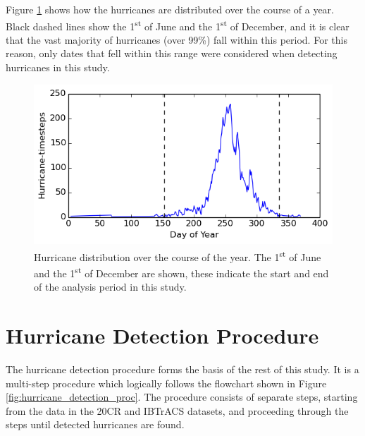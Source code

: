\documentclass[pdftex,12pt,a4paper]{report}
\newcommand{\ts}{\textsuperscript}
\begin{document}
\newpage
Figure \ref{fig:yearly_hurr_dist} shows how the hurricanes are distributed over the course of a
year. Black dashed lines show the 1\ts{st} of June and the 1\ts{st} of December, and it is clear
that the vast majority of hurricanes (over 99\%) fall within this period. For this reason, only
dates that fell within this range were considered when detecting hurricanes in this study.

\begin{figure}[hb!]
    \centering
    \includegraphics[width=\textwidth]{figures/yearly_hurr_dist}
    \caption{Hurricane distribution over the course of the year. The 1\ts{st} of June and the
    1\ts{st} of December are shown, these indicate the start and end of the analysis period in this
    study. }
    \label{fig:yearly_hurr_dist}
\end{figure}

\chapter{Hurricane Detection Procedure}
\label{chap:hurricane_detection_proc}


The hurricane detection procedure forms the basis of the rest of this study. It is a multi-step
procedure which logically follows the flowchart shown in Figure \ref{fig:hurricane_detection_proc}.
The procedure consists of separate steps, starting from the data in the 20CR and IBTrACS
datasets, and proceeding through the steps until detected hurricanes are found. 
\end{document}
